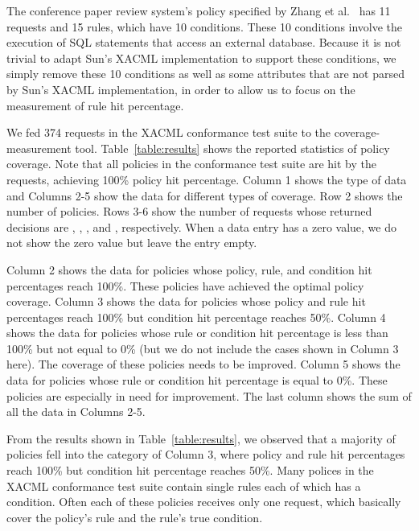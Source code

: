 The conference paper review system's policy specified by Zhang et
al.~\cite{zhang04:synthesis} has 11 requests and 15 rules, which
have 10 conditions. These 10 conditions involve the execution of SQL
statements that access an external database. Because it is not
trivial to adapt Sun's XACML implementation to support these
conditions, we simply remove these 10 conditions as well as some
attributes that are not parsed by Sun's XACML implementation, in
order to allow us to focus on the measurement of rule hit
percentage.

We fed 374 requests in the XACML conformance test suite to the
coverage-measurement tool. Table~\ref{table:results} shows the
reported statistics of policy coverage. Note that all policies in
the conformance test suite are hit by the requests, achieving 100\%
policy hit percentage. Column 1 shows the type of data and Columns
2-5 show the data for different types of coverage. Row 2 shows the
number of policies. Rows 3-6 show the number of requests whose
returned decisions are , ,
, and , respectively.
When a data entry has a zero value, we do not show the zero value
but leave the entry empty.

Column 2 shows the data for policies whose policy, rule, and
condition hit percentages reach 100\%. These policies have achieved
the optimal policy coverage. Column 3 shows the data for policies
whose policy and rule hit percentages reach 100\% but condition hit
percentage reaches 50\%. Column 4 shows the data for policies whose rule or condition
hit percentage is less than 100\% but not equal to 0\% (but we do
not include the cases shown in Column 3 here). The coverage of these
policies needs to be improved. Column 5 shows the data for policies
whose rule or condition hit percentage is equal to 0\%. These
policies are especially in need for improvement. The last column
shows the sum of all the data in Columns 2-5.

From the results shown in Table~\ref{table:results}, we observed
that a majority of policies fell into the category of Column 3,
where policy and rule hit percentages reach 100\% but condition
hit percentage reaches 50\%. Many polices in the XACML conformance
test suite contain single rules each of which has a condition.
Often each of these policies receives only one request, which
basically cover the policy's rule and the rule's true condition.

